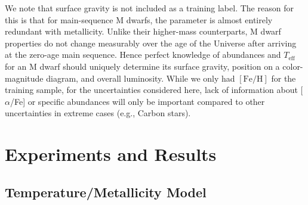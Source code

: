 \documentclass[twocolumn]{aastex62}
\newcommand{\teff}{T_{\mathrm{eff}}}
\newcommand{\feh}{[{\mathrm{Fe}/\mathrm{H}}]}
\begin{document}
We note that surface gravity is not included as a training label. The reason for this is that for main-sequence M dwarfs, the parameter is almost entirely redundant with metallicity. Unlike their higher-mass counterparts, M dwarf properties do not change measurably over the age of the Universe after arriving at the zero-age main sequence. Hence perfect knowledge of abundances and $\teff$ for an M dwarf should uniquely determine its surface gravity, position on a color-magnitude diagram, and overall luminosity. While we only had $\feh$ for the training sample, for the uncertainties considered here, lack of information about [$\alpha$/Fe] or specific abundances will only be important compared to other uncertainties in extreme cases (e.g., Carbon stars).  


\section{Experiments and Results} \label{sec:results}

\subsection{Temperature/Metallicity Model \label{subsec:mann_results}}
\end{document}

